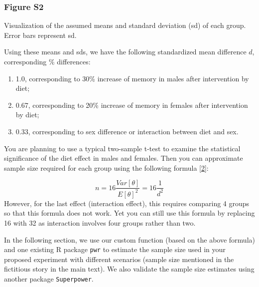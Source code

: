 \documentclass[
]{article}
\begin{document}
\hypertarget{figure-s2}{%
\subsubsection{Figure S2}\label{figure-s2}}

Visualization of the assumed means and standard deviation (sd) of each
group. Error bars represent sd.

Using these means and sds, we have the following standardized mean
difference \(d\), corresponding \% differences:

\begin{enumerate}
\def\labelenumi{(\arabic{enumi})}
\item
  1.0, corresponding to 30\% increase of memory in males after
  intervention by diet;
\item
  0.67, corresponding to 20\% increase of memory in females after
  intervention by diet;
\item
  0.33, corresponding to sex difference or interaction between diet and
  sex.
\end{enumerate}

You are planning to use a typical two-sample t-test to examine the
statistical significance of the diet effect in males and females. Then
you can approximate sample size required for each group using the
following formula {[}\protect\hyperlink{ref-lehr1992sixteen}{2}{]}:

\[
n = \text{16} \frac{Var[θ]} {E[θ]^2} = \text{16} \frac{1} {d^2}
\] However, for the last effect (interaction effect), this requires
comparing 4 groups so that this formula does not work. Yet you can still
use this formula by replacing 16 with 32 as interaction involves four
groups rather than two.

In the following section, we use our custom function (based on the above
formula) and one existing R package \texttt{pwr} to estimate the sample
size used in your proposed experiment with different scenarios (sample
size mentioned in the fictitious story in the main text). We also
validate the sample size estimates using another package
\texttt{Superpower}.
\end{document}
